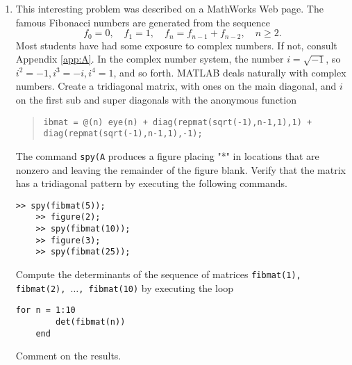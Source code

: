 \documentclass[../main.tex]{subfiles}
\begin{document}
\begin{enumerate}[label=\textbf{\thechapter.\arabic{*}}, resume ]
  \item \label{pr:4_28} This interesting problem was described on a MathWorks Web page. The famous Fibonacci numbers are generated from the sequence
  \begin{equation*}
    f_0 = 0,\quad f_1 = 1,\quad f_n = f_{n-1} + f_{n-2},\quad n \geq 2.
  \end{equation*}
  Most students have had some exposure to complex numbers. If not, consult Appendix \ref{app:A}. In the complex number system, the number \(i = \sqrt{-1}\), so \(i^2 = -1, i^3 = -i, i^4 = 1\), and so forth. MATLAB deals naturally with complex numbers. Create a tridiagonal matrix, with ones on the main diagonal, and \(i\) on the first sub and super diagonals with the anonymous function
  \begin{quote}
    \texttt{\footnotesize ibmat = @(n) eye(n) + diag(repmat(sqrt(-1),n-1,1),1) + diag(repmat(sqrt(-1),n-1,1),-1);}
  \end{quote}
    The command \texttt{spy(A} produces a figure placing "*" in locations that are nonzero and leaving the remainder of the figure blank. Verify that the matrix has a tridiagonal pattern by executing the following commands.\begin{lstlisting}[numbers=none,frame=none]
	>> spy(fibmat(5));
	>> figure(2);
	>> spy(fibmat(10));
	>> figure(3);
	>> spy(fibmat(25));
  \end{lstlisting}
  Compute the determinants of the sequence of matrices \texttt{fibmat(1), fibmat(2), \(\ldots\), fibmat(10)} by executing the loop\begin{lstlisting}[numbers=none,frame=none]
	for n = 1:10
		det(fibmat(n))
	end
  \end{lstlisting}
  Comment on the results.
  

\end{enumerate}
\end{document}
